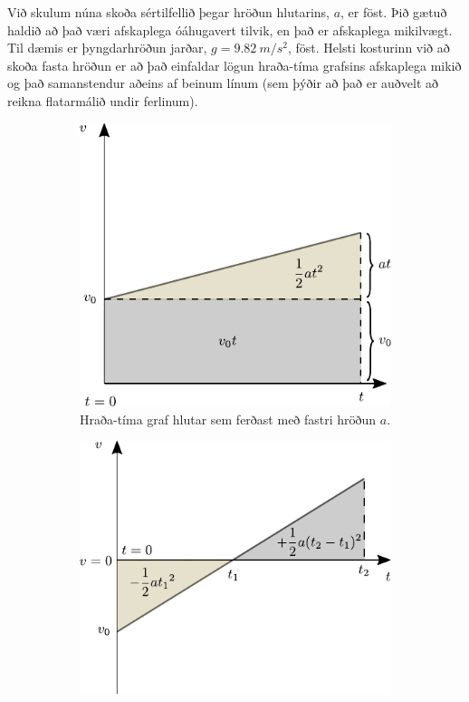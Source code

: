 \ifdefined \wholebook \else\documentclass[oneside]{book}\usepackage{EdlBook}\graphicspath{{figures/}}
\begin{document}
Við skulum núna skoða sértilfellið þegar hröðun hlutarins, $a$, er föst. Þið gætuð haldið að það væri afskaplega óáhugavert tilvik, en það er afskaplega mikilvægt. Til dæmis er þyngdarhröðun jarðar, $g = \SI{9.82}{m/s^2}$, föst. Helsti kosturinn við að skoða fasta hröðun er að það einfaldar lögun hraða-tíma grafsins afskaplega mikið og það samanstendur aðeins af beinum línum (sem þýðir að það er auðvelt að reikna flatarmálið undir ferlinum).

\begin{figure}[H]
    \centering
\begin{subfigure}[h]{.4\textwidth}
    \centering
    \includegraphics[width=\linewidth]{figures/hradatimagraf-sonnun.pdf}
    \caption{Hraða-tíma graf hlutar sem ferðast með fastri hröðun $a$.}
    \label{fig:fast-hrodun}
\end{subfigure}
\hfill
\begin{subfigure}[h]{.4\textwidth}
    \centering
    \includegraphics[width=\linewidth]{figures/hradatimagraf-neikvaett.pdf}

\end{subfigure}
\end{figure}
\end{document}
